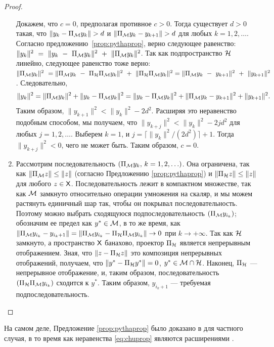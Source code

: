 \documentclass[12pt, specialist, subf,href,colorlinks=true,substylefile = spbu.rtx]{disser}
\theoremstyle{remark}
\theoremstyle{definition}
\begin{document}
\begin{proof}
\begin{enumerate}
		Докажем, что $c = 0$, предполагая противное $c > 0$. Тогда существует $d > 0$ такая, что $\|y_k - \Pi_{\mathcal{M}} y_k\| > d$ и $\|\Pi_{\mathcal{M}} y_k - y_{k + 1}\| > d$ для любых $k = 1, 2, \ldots$. Согласно предложению~\ref{prop:pythaprop}, верно следующее равенство: $\|y_k \|^2~=~\|y_k~-~\Pi_{\mathcal{M}} y_k\|^2~+~\|\Pi_{\mathcal{M}} y_k \|^2$. Так как подпространство $\mathcal{H}$ линейно, следующее равенство тоже верно:
		$\|\Pi_{\mathcal{M}} y_k \|^2~=\|\Pi_{\mathcal{M}} y_k~-~\Pi_{\mathcal{H}} \Pi_{\mathcal{M}} y_k\|^2~+~\|\Pi_{\mathcal{H}} \Pi_{\mathcal{M}} y_k \|^2 = \|\Pi_{\mathcal{M}} y_k~-~y_{k+1}\|^2~+~\|y_{k+1} \|^2$. Следовательно,
		\begin{equation*}
		\|y_k\|^2 = \|\Pi_{\mathcal{M}} y_k\|^2 + \|y_k - \Pi_{\mathcal{M}} y_k\|^2 = \|y_k - \Pi_{\mathcal{M}} y_k\|^2 + \|\Pi_{\mathcal{M}} y_k - y_{k + 1}\|^2 + \|y_{k + 1}\|^2.
		\end{equation*}
		Таким образом, $\|y_{k+1}\|^2 < \|y_k\|^2 - 2d^2$. Расширяя это неравенство подобным способом, мы получаем, что $\|y_{k+j}\|^2 < \|y_k\|^2 - 2 j d^2$ для любых $j = 1, 2, \ldots$. Выберем $k = 1$, и $j = \lceil \|y_k\|^2 / (2d^2) \rceil + 1$. Тогда $\|y_{k+j}\|^2 < 0$, чего не может быть. Таким образом, $c=0$.
		\item Рассмотрим последовательность $(\Pi_{\mathcal{M}} y_k,\, k = 1, 2, \ldots)$. Она ограничена, так как $\|\Pi_{\mathcal{M}} z\| \le \|z\|$ (согласно Предложению \ref{prop:pythaprop}) и $\|\Pi_{\mathcal{H}} z\| \le \|z\|$ для любого $z \in \mathsf{X}$. Последовательность лежит в компактном множестве, так как $\mathcal{M}$ замкнуто относительно операции умножения на скаляр, и мы можем растянуть единичный шар так, чтобы он покрывал последовательность. Поэтому можно выбрать сходящуюся подпоследовательность $(\Pi_{\mathcal{M}} y_{i_k})$; обозначим ее предел как $y^*\in\mathcal{M}$, в то же время, как $\|\Pi_{\mathcal{M}} y_{i_k} - y_{i_k + 1}\| = \|\Pi_{\mathcal{M}} y_{i_k} - \Pi_{\mathcal{H}} \Pi_{\mathcal{M}} y_{i_k}\| \to 0$ при $k \to + \infty$. Так как $\mathcal{H}$ замкнуто, а пространство $\mathsf{X}$ банахово, проектор $\Pi_{\mathcal{H}}$ является непрерывным отображением. Зная, что $\|z - \Pi_{\mathcal{H}} z\|$ это композиция непрерывных отображений, получаем, что $\|y^* - \Pi_{\mathcal{H}} y^*\| = 0$, $y^* \in \mathcal{M} \cap \mathcal{H}$. Наконец, $\Pi_{\mathcal{H}}$ --- непрерывное отображение, и, таким образом, последовательность $(\Pi_{\mathcal{H}} \Pi_{\mathcal{M}} y_{i_k})$ сходится к $y^*$. Таким образом, $y_{i_k + 1}$ --- требуемая подпоследовательность.
	\end{enumerate}
\end{proof}

На самом деле, Предложение \ref{prop:pythaprop} было доказано в \cite{Gillard.Zhigljavsky2013} для частного случая, в то время как неравенства \eqref{eq:chuprop} являются расширениями \cite[неравенств (4.1)]{Chu.etal2003}.
\end{document}

